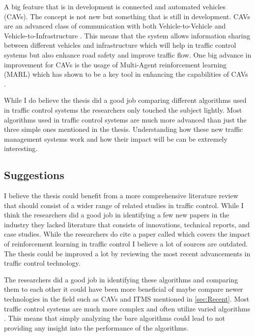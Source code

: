 \documentclass[10pt, titlepage]{article}
\begin{document}
A big feature that is in development is connected and automated vehicles (CAVs). The concept is not new but something that is still in development. CAVs are an advanced class of communication with both Vehicle-to-Vehicle and Vehicle-to-Infrastructure \cite{guanetti2018control}. This means that the system allows information sharing between different vehicles and infrastructure which will help in traffic control systems but also enhance road safety and improve traffic flow. One big advance in improvement for CAVs is the usage of Multi-Agent reinforcement learning (MARL) which has shown to be a key tool in enhancing the capabilities of CAVs \cite{hua2023multi}.

While I do believe the thesis did a good job comparing different algorithms used in traffic control systems the researchers only touched the subject lightly. Most algorithms used in traffic control systems are much more advanced than just the three simple ones mentioned in the thesis. Understanding how these new traffic management systems work and how their impact will be can be extremely interesting.

\subsection{Suggestions}
I believe the thesis could benefit from a more comprehensive literature review that should consist of a wider range of related studies in traffic control. While I think the researchers did a good job in identifying a few new papers in the industry they lacked literature that consists of innovations, technical reports, and case studies. While the researchers do cite a paper called  \cite{yang2017reinforcement} which covers the impact of reinforcement learning in traffic control I believe a lot of sources are outdated. The thesis could be improved a lot by reviewing the most recent advancements in traffic control technology.

The researchers did a good job in identifying these algorithms and comparing them to each other it could have been more beneficial of maybe compare newer technologies in the field such as CAVs and ITMS mentioned in \ref{sec:Recent}. Most traffic control systems are much more complex and often utilize varied algorithms \cite{qadri2020state}. This means that simply analyzing the bare algorithms could lead to not providing any insight into the performance of the algorithms.
\end{document}
